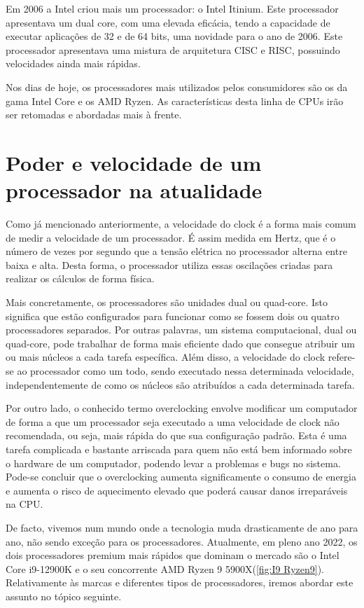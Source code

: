 \documentclass{report}
\begin{document}
Em 2006 a \ac{Intel} criou mais um processador: o \ac{Intel} Itinium. Este processador apresentava um dual core, com uma elevada eficácia, tendo a capacidade de executar aplicações de 32 e de 64 bits, uma novidade para o ano de 2006. Este processador apresentava uma mistura de arquitetura \ac{CISC} e \ac{RISC}, possuindo velocidades ainda mais rápidas\cite{Historia1}. 

Nos dias de hoje, os processadores mais utilizados pelos consumidores são os da gama \ac{Intel} Core e os \ac{AMD} Ryzen. As características desta linha de \ac{CPU}s irão ser retomadas e abordadas mais à frente.

 
\section{Poder e velocidade de um processador na atualidade}
Como já mencionado anteriormente, a velocidade do clock é a forma mais comum de medir a velocidade de um processador. É assim medida em Hertz, que é o número de vezes por segundo que a tensão elétrica no processador alterna entre baixa e alta. Desta forma, o processador utiliza essas oscilações criadas para realizar os cálculos de forma física\cite{Aplicações1/Velocidade1}. 

Mais concretamente, os processadores são unidades dual ou quad-core. Isto significa que estão configurados para funcionar como se fossem dois ou quatro processadores separados. Por outras palavras, um sistema computacional, dual ou quad-core, pode trabalhar de forma mais eficiente dado que consegue atribuir um ou mais núcleos a cada tarefa específica. Além disso, a velocidade do clock refere-se ao processador como um todo, sendo executado nessa determinada velocidade, independentemente de como os núcleos são atribuídos a cada determinada tarefa\cite{Velocidade2}.

Por outro lado, o conhecido termo overclocking envolve modificar um computador de forma a que um processador seja executado a uma velocidade de clock não recomendada, ou seja, mais rápida do que sua configuração padrão. Esta é uma tarefa complicada e bastante arriscada para quem não está bem informado sobre o hardware de um computador, podendo levar a problemas e bugs no sistema. Pode-se concluir que o overclocking aumenta significamente o consumo de energia e aumenta o risco de aquecimento elevado que poderá causar danos irreparáveis na \ac{CPU}\cite{Velocidade3}.

De facto, vivemos num mundo onde a tecnologia muda drasticamente de ano para ano, não sendo exceção para os processadores. Atualmente, em pleno ano 2022, os dois processadores premium mais rápidos que dominam o mercado são o \ac{Intel} Core i9-12900K e o seu concorrente \ac{AMD} Ryzen 9 5900X(\ref{fig:I9 Ryzen9}). Relativamente às marcas e diferentes tipos de processadores, iremos abordar este assunto no tópico seguinte.
\end{document}

